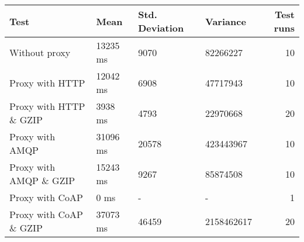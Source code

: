 \begin{tabular}{llllr}
\hline
 Test                   & Mean     & Std. Deviation   & Variance   &   Test runs \\
\hline
 Without proxy          & 13235 ms & 9070             & 82266227   &          10 \\
 Proxy with HTTP        & 12042 ms & 6908             & 47717943   &          10 \\
 Proxy with HTTP \& GZIP & 3938 ms  & 4793             & 22970668   &          20 \\
 Proxy with AMQP        & 31096 ms & 20578            & 423443967  &          10 \\
 Proxy with AMQP \& GZIP & 15243 ms & 9267             & 85874508   &          10 \\
 Proxy with CoAP        & 0 ms     & -                & -          &           1 \\
 Proxy with CoAP \& GZIP & 37073 ms & 46459            & 2158462617 &          20 \\
\hline
\end{tabular}